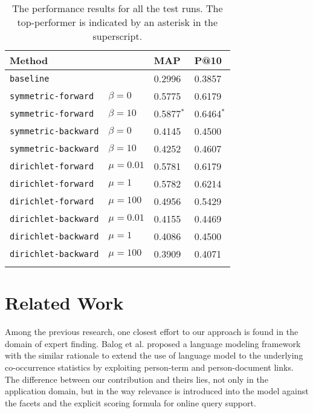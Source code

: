 \begin{table}[ht!]
  \centering
  \begin{tabular}{llll}
    Method & & MAP & P@10 \\
    \hline
    {\tt baseline} & & 0.2996 & 0.3857 \\
    {\tt symmetric-forward} & $\beta = 0$ & 0.5775 & 0.6179\\
    {\tt symmetric-forward} & $\beta = 10$ & 0.5877$^*$ & 0.6464$^*$ \\
    {\tt symmetric-backward} & $\beta = 0$ & 0.4145 & 0.4500\\
    {\tt symmetric-backward} & $\beta = 10$ & 0.4252 & 0.4607\\
    {\tt dirichlet-forward} & $\mu = 0.01$ & 0.5781 & 0.6179 \\
    {\tt dirichlet-forward} & $\mu = 1$ & 0.5782 & 0.6214 \\
    {\tt dirichlet-forward} & $\mu = 100$ & 0.4956 & 0.5429 \\
    {\tt dirichlet-backward} & $\mu = 0.01$ & 0.4155 & 0.4469 \\
    {\tt dirichlet-backward} & $\mu = 1$ & 0.4086 & 0.4500 \\
    {\tt dirichlet-backward} & $\mu = 100$ & 0.3909 & 0.4071 \\
    \\
  \end{tabular}
  \caption{The performance results for all the test runs.  The top-performer is indicated by an asterisk in the superscript.}
  \label{t:performance}
\end{table}

\section{Related Work}



Among the previous research, one closest effort to our approach is found in the
domain of expert finding.  Balog et al. \cite{balog2009language} proposed a
language modeling framework with the similar rationale to extend the use of
language model to the underlying co-occurrence statistics by exploiting
person-term and person-document links.  The difference between our contribution
and theirs lies, not only in the application domain, but in the way relevance
is introduced into the model against the facets and the explicit scoring
formula for online query support.
 
